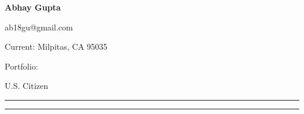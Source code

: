     {\fontsize{35}{60}\textbf{       Abhay Gupta}}

    \begin{subtitle}
        \vspace{-11ex}
        {{ab18gu@gmail.com}}
        \,\SubBulletSymbol\,
            \href{\CVWebpage}
            {\CVWebpage}
        \,\SubBulletSymbol\,
            \href{\github}
            {\github}
        \par{Current: \color{cblue} Milpitas, CA 95035}
        \par{Portfolio: \color{red} \href{\CVWebg}{\CVWeb}{}}
        \par{U.S. Citizen}

    \end{subtitle}

    \vspace{-3ex}
    {\hspace{0.07in}\noindent\color{dblue}\rule{7.1in}{0.4pt}}

    \vspace{-3ex}
    {\hspace{0.07in}\noindent\color{dblue}\rule{7.1in}{0.4pt}}


